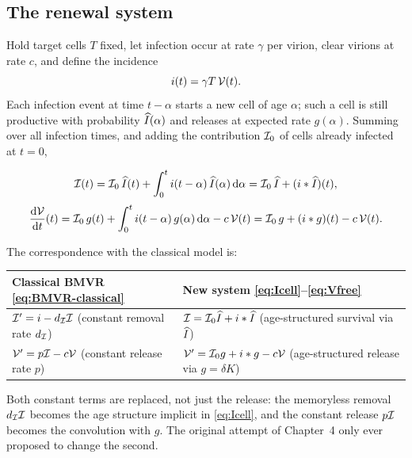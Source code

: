 \subsection{The renewal system}

Hold target cells $T$ fixed, let infection occur at rate $\gamma$ per
virion, clear virions at rate $c$, and define the incidence
\begin{equation}
i(t)=\gamma T\,\mathcal{V}(t).
\end{equation}
Each infection event at time $t-\alpha$ starts a new cell of age $\alpha$;
such a cell is still productive with probability $\widehat{I}(\alpha)$ and
releases at expected rate $g(\alpha)$. Summing over all infection times,
and adding the contribution $\mathcal{I}_0$ of cells already infected at $t=0$,

\begin{theorem}
\label{res:new-vde}
\begin{equation}
\mathcal{I}(t)=\mathcal{I}_0\,\widehat{I}(t)+\int_0^t i(t-\alpha)\,\widehat{I}(\alpha)\,{\rm d}\alpha
=\mathcal{I}_0\,\widehat{I}+(i*\widehat{I})(t),
\label{eq:Icell}
\end{equation}
\begin{equation}
\displaystyle\frac{{\rm d} \mathcal{V}}{{\rm d} t}(t)
=\mathcal{I}_0\,g(t)+\int_0^t i(t-\alpha)\,g(\alpha)\,{\rm d}\alpha-c\,\mathcal{V}(t)
=\mathcal{I}_0\,g+(i*g)(t)-c\,\mathcal{V}(t).
\label{eq:Vfree}
\end{equation}
\end{theorem}

\noindent
The correspondence with the classical model is:
\begin{center}
\renewcommand{\arraystretch}{1.3}
\begin{tabular}{@{}p{}p{}@{}}
\toprule
Classical BMVR \eqref{eq:BMVR-classical} & New system \eqref{eq:Icell}--\eqref{eq:Vfree} \\
\midrule
$\mathcal{I}'=i-d_{\mathcal{I}}\mathcal{I}$
  (constant removal rate $d_{\mathcal{I}}$)
& $\mathcal{I} = \mathcal{I}_0\widehat{I} + i*\widehat{I}$
  (age-structured survival via $\widehat{I}$) \\[0.6em]
$\mathcal{V}'=p\mathcal{I}-c\mathcal{V}$
  (constant release rate $p$)
& $\mathcal{V}' = \mathcal{I}_0 g + i*g - c\mathcal{V}$
  (age-structured release via $g=\delta K$) \\
\bottomrule
\end{tabular}
\end{center}
Both constant terms are replaced, not just the release: the memoryless
removal $d_{\mathcal{I}}\mathcal{I}$ becomes the age structure implicit in
\eqref{eq:Icell}, and the constant release $p\mathcal{I}$ becomes the
convolution with $g$. The original attempt of Chapter~4 only ever proposed
to change the second.

